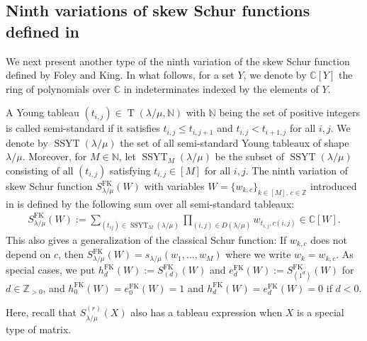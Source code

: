 \documentclass[12pt]{amsart}%
\theoremstyle{definition}
\newtheorem{theorem}{Theorem}[section]
\DeclareMathOperator{\T}{T}
\DeclareMathOperator{\SSYT}{SSYT}
\newcommand{\bu}{\boldsymbol u}
\newcommand{\FK}{\mathrm{FK}}
\begin{document}
\subsection{Ninth variations of skew Schur functions defined in \cite{fk21}}

We next present another type of the ninth variation of the skew Schur function defined by Foley and King.
In what follows, for a set $Y$,
we denote by $\mathbb{C}[Y]$ the ring of polynomials over $\mathbb{C}$ in indeterminates indexed by the elements of $Y$.


A Young tableau $(t_{i,j})\in \T(\lambda/\mu,\mathbb{N})$
with $\mathbb{N}$ being the set of positive integers is called semi-standard if it satisfies 
$t_{i,j}\le t_{i,j+1}$ and $t_{i,j}<t_{i+1,j}$
for all $i,j$.
We denote by $\SSYT(\lambda/\mu)$ the set of all semi-standard Young tableaux of shape $\lambda/\mu$. 
Moreover, for $M\in\mathbb{N}$,
let $\SSYT_M(\lambda/\mu)$ be the subset of $\SSYT(\lambda/\mu)$
consisting of all $(t_{i,j})$ satisfying $t_{i,j}\in [M]$ for all $i,j$.
The ninth variation of skew Schur function
$S^{\FK}_{\lambda/\mu}(W)$ 
with variables $W=\{w_{k,c}\}_{k\in [M],\,c\in \mathbb{Z}}$ introduced in \cite{fk21}
is defined by the following sum over all semi-standard tableaux:
\begin{align}
\label{def:9thFK}
S^{\FK}_{\lambda/\mu}(W)
:=\sum_{(t_{ij})\in \SSYT_M(\lambda/\mu)}\prod_{(i,j)\in D(\lambda/\mu)}w_{t_{i,j},c(i,j)}
\in\mathbb{C}[W].
\end{align}
This also gives a generalization of the  classical Schur function:
If $w_{k,c}$ does not depend on $c$,
then $S^{\FK}_{\lambda/\mu}(W)=s_{\lambda/\mu}(w_1,\ldots,w_M)$ where we write $w_k=w_{k,c}$.
As special cases, 
we put $h^{\FK}_d(W):=S^{\FK}_{(d)}(W)$ and $e^{\FK}_d(W):=S^{\FK}_{(1^d)}(W)$ for $d\in\mathbb{Z}_{>0}$, 
and $h^{\FK}_0(W)=e^{\FK}_0(W)=1$ and $h^{\FK}_d(W)=e^{\FK}_d(W)=0$ if $d<0$. 

Here, recall that 
$S^{(r)}_{\lambda/\mu}(X)$ 
also has a tableau expression when
$X$ is a special type of matrix.

\end{document}
